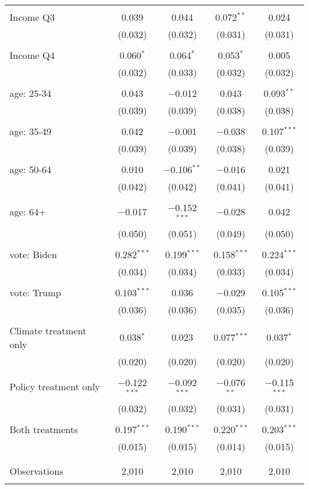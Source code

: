 \begin{tabular}{@{\extracolsep{5pt}}lcccc}
  & & & & \\ 
 Income Q3 & 0.039 & 0.044 & 0.072$^{**}$ & 0.024 \\ 
  & (0.032) & (0.032) & (0.031) & (0.031) \\ 
  & & & & \\ 
 Income Q4 & 0.060$^{*}$ & 0.064$^{*}$ & 0.053$^{*}$ & 0.005 \\ 
  & (0.032) & (0.033) & (0.032) & (0.032) \\ 
  & & & & \\ 
 age: 25-34 & 0.043 & $-$0.012 & 0.043 & 0.093$^{**}$ \\ 
  & (0.039) & (0.039) & (0.038) & (0.038) \\ 
  & & & & \\ 
 age: 35-49 & 0.042 & $-$0.001 & $-$0.038 & 0.107$^{***}$ \\ 
  & (0.039) & (0.039) & (0.038) & (0.039) \\ 
  & & & & \\ 
 age: 50-64 & 0.010 & $-$0.106$^{**}$ & $-$0.016 & 0.021 \\ 
  & (0.042) & (0.042) & (0.041) & (0.041) \\ 
  & & & & \\ 
 age: 64+ & $-$0.017 & $-$0.152$^{***}$ & $-$0.028 & 0.042 \\ 
  & (0.050) & (0.051) & (0.049) & (0.050) \\ 
  & & & & \\ 
 vote: Biden & 0.282$^{***}$ & 0.199$^{***}$ & 0.158$^{***}$ & 0.224$^{***}$ \\ 
  & (0.034) & (0.034) & (0.033) & (0.034) \\ 
  & & & & \\ 
 vote: Trump & 0.103$^{***}$ & 0.036 & $-$0.029 & 0.105$^{***}$ \\ 
  & (0.036) & (0.036) & (0.035) & (0.036) \\ 
  & & & & \\ 
 Climate treatment only & 0.038$^{*}$ & 0.023 & 0.077$^{***}$ & 0.037$^{*}$ \\ 
  & (0.020) & (0.020) & (0.020) & (0.020) \\ 
  & & & & \\ 
 Policy treatment only & $-$0.122$^{***}$ & $-$0.092$^{***}$ & $-$0.076$^{**}$ & $-$0.115$^{***}$ \\ 
  & (0.032) & (0.032) & (0.031) & (0.031) \\ 
  & & & & \\ 
 Both treatments & 0.197$^{***}$ & 0.190$^{***}$ & 0.220$^{***}$ & 0.203$^{***}$ \\ 
  & (0.015) & (0.015) & (0.014) & (0.015) \\ 
  & & & & \\ 
\hline \\[-1.8ex] 

Observations & 2,010 & 2,010 & 2,010 & 2,010 \\ 
\hline 
\hline \\[-1.8ex] 
\end{tabular} 